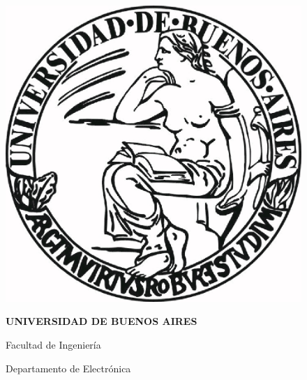 \fancyhead{} %
\fancyfoot{} %
\fancyhead[C]{\journal \ \  $\bullet$ \ \ \nicedate} %
\fancyfoot[RO,LE]{\thepage} %

\begin{titlepage}
\begin{figure}[!t]
\begin{centering}
\includegraphics[scale=0.8]{./img/logo-uba}
\par\end{centering}

\bigskip{}


\begin{centering}
\textbf{\LARGE{}UNIVERSIDAD DE BUENOS AIRES}
\par\end{centering}{\Large \par}

\bigskip{}


\begin{centering}
{\LARGE{}Facultad de Ingeniería}
\par\end{centering}{\Large \par}

\bigskip{}


\begin{centering}
{\Large{}Departamento de Electrónica}
\par\end{centering}{\Large \par}


\end{figure}
\end{titlepage}
